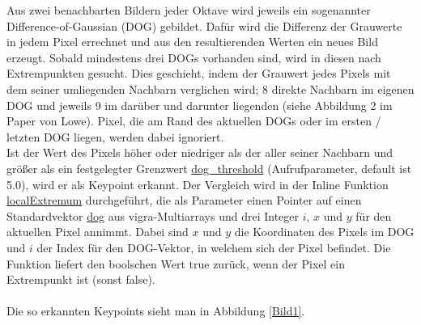 \documentclass[a4paper,12pt]{scrartcl}
\begin{document}
Aus zwei benachbarten Bildern jeder Oktave wird jeweils ein sogenannter 
Difference-of-Gaussian (DOG) gebildet. Dafür wird die Differenz der Grauwerte in jedem 
Pixel errechnet und aus den resultierenden Werten ein neues Bild erzeugt. Sobald 
mindestens drei DOGs vorhanden sind, wird in diesen nach Extrempunkten gesucht. Dies 
geschieht, indem der Grauwert jedes Pixels mit dem seiner umliegenden Nachbarn verglichen 
wird; 8 direkte Nachbarn im eigenen DOG und jeweils 9 im darüber und darunter liegenden 
(siehe Abbildung 2 im Paper  von Lowe). Pixel, die am Rand des aktuellen DOGs oder im 
ersten / letzten DOG liegen, werden dabei ignoriert. \\
Ist der Wert des Pixels höher oder niedriger als der aller seiner Nachbarn und größer als 
ein festgelegter Grenzwert \url{dog_threshold} (Aufrufparameter, default ist 5.0), wird 
er als Keypoint erkannt.  Der Vergleich wird in der Inline Funktion \url{localExtremum} 
durchgeführt, die als Parameter einen Pointer auf einen Standardvektor \url{dog} aus 
vigra-Multiarrays und drei Integer $i$, $x$ und $y$ für den aktuellen Pixel annimmt. 
Dabei sind $x$ und $y$ die Koordinaten des Pixels im DOG und $i$ der Index für den 
DOG-Vektor, in welchem sich der Pixel befindet.  Die Funktion liefert den boolschen Wert
true zurück, wenn der Pixel ein Extrempunkt ist (sonst false).
\\ \ \\
Die so erkannten Keypoints sieht man in Abbildung \ref{Bild1}.
\end{document}
